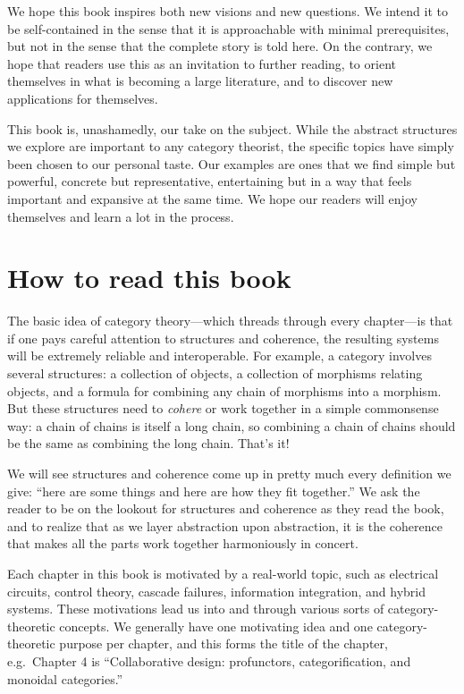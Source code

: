 \documentclass[7Sketches]{subfiles}
\begin{document}
We hope this book inspires both new visions and new questions. We intend it
to be self-contained in the sense that it is approachable with minimal
prerequisites, but not in the sense that the complete story is told here. On the
contrary, we hope that readers use this as an invitation to further reading, to
orient themselves in what is becoming a large literature, and to discover new applications for themselves.

This book is, unashamedly, our take on the subject. While the abstract
structures we explore are important to any category theorist, the specific
topics have simply been chosen to our personal taste. Our examples are ones that
we find simple but powerful, concrete but representative, entertaining but in a
way that feels important and expansive at the same time. We hope our readers
will enjoy themselves and learn a lot in the process.

\section*{How to read this book}

The basic idea of category theory---which threads through every chapter---is that if one pays careful attention to structures and coherence, the resulting systems will be extremely reliable and interoperable. For example, a category involves several structures: a collection of objects, a collection of morphisms relating objects, and a formula for combining any chain of morphisms into a morphism. But these structures need to \emph{cohere} or work together in a simple commonsense way: a chain of chains is itself a long chain, so combining a chain of chains should be the same as combining the long chain. That's it!

We will see structures and coherence come up in pretty much every definition we
give: ``here are some things and here are how they fit together.'' We ask the
reader to be on the lookout for structures and coherence as they read the book,
and to realize that as we layer abstraction upon abstraction, it is the coherence
that makes all the parts work together harmoniously in concert.

Each chapter in this book is motivated by a real-world topic, such as electrical circuits, control theory, cascade failures, information integration, and hybrid systems. These motivations lead us into and through various sorts of category-theoretic concepts. We generally have one motivating idea and one category-theoretic purpose per chapter, and this forms the title of the chapter, e.g.\ Chapter 4 is ``Collaborative design: profunctors, categorification, and monoidal categories.''
\end{document}
